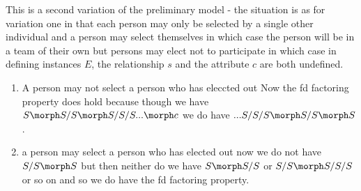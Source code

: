 
This is a second variation of the preliminary model - the situation is as for variation one in that  each person may only be selected by a single other individual and a person may select themselves in which case the person will be in a team of their own but persons may elect not to participate in which case
in defining instances $E$, the relationship $s$ and the attribute $c$ are both undefined.


\begin{enumerate}
\item
A person may not select a person who has eleccted out 
Now the fd factoring property does hold because though we have $S \morph S/S \morph S/S/S ... \morph c$ 
we do have $... S/S/S \morph S/S \morph S$.
\item
a person may select a person who has elected out
now we do not have $S/S \morph S$ but then neither do we have $S \morph S/S$ or $S/S \morph S/S/S$ or so on and so we do have the fd factoring property.
\end{enumerate}

